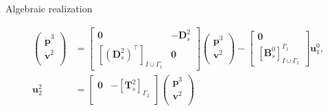 \documentclass[aspectratio=169]{beamer}
\begin{document}
\begin{frame}{Algebraic realization}
{\begin{tcolorbox}
\begin{equation*}
\begin{aligned}
				\begin{pmatrix}
					\dot{\mathbf{p}}^3 \\
					\dot{\mathbf{v}}^2 \\
				\end{pmatrix} &=  
				\begin{bmatrix}
					\mathbf{0} & -\mathbf{D}^{2}_s \\
					[(\mathbf{D}_{s}^{2})^\top]_{I \cup \Gamma_1} & \mathbf{0}
				\end{bmatrix}
				\begin{pmatrix}
					{\mathbf{p}}^3 \\
					{\mathbf{v}}^2 \\
				\end{pmatrix} -
				\begin{bmatrix}
					\mathbf{0}\\
					[\mathbf{B}^{0}_{s}]_{I \cup \Gamma_1}^{\Gamma_1}
				\end{bmatrix}
				\mathbf{u}^{0}_1, \\
				{\mathbf{u}}^{2}_2 &= 
				\begin{bmatrix}
					\mathbf{0} & -[\mathbf{T}^{2}_{s}]_{\Gamma_2} \\
				\end{bmatrix}
				\begin{pmatrix}
					{\mathbf{p}}^3 \\
					{\mathbf{v}}^2 \\
				\end{pmatrix}
			\end{aligned}
		\end{equation*}
	\end{tcolorbox} 
}
	
	
\end{frame}
\end{document}
